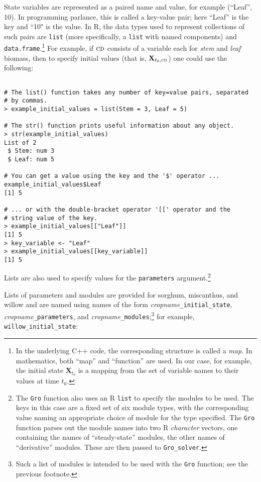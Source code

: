 \documentclass{article}
\newcommand{\code}[1]{\texttt{#1}}
\newcommand{\boldX}{\mathbf{X}}
\newcommand{\cd}{\textsc{cd}}
\begin{document}
State variables are represented as a paired name and value, for
example (``Leaf'', 10). In programming parlance, this is called a
key-value pair; here ``Leaf'' is the key and ``10" is the value.  In
R, the data types used to represent collections of such pairs are
\code{list} (more specifically, a \code{list} with named components)
and \code{data.frame}.\footnote{In the underlying C++ code, the
  corresponding structure is called a \emph{map}.  In mathematics,
  both ``map'' and ``function'' are used.  In our case, for example,
  the initial state $\boldX_{t_0}$ is a mapping from the set of
  variable names to their values at time $t_0$.} For example, if $\cd$
consists of a variable each for \emph{stem} and \emph{leaf} biomass,
then to specify initial values (that is, $\boldX_{t_0,\cd}$) one could
use the following:

\lstset{
  xleftmargin=0.05\textwidth, xrightmargin=0.2\textwidth
}

\begin{center}
  \begin{lstlisting}
    
# The list() function takes any number of key=value pairs, separated
# by commas.
> example_initial_values = list(Stem = 3, Leaf = 5)

# The str() function prints useful information about any object.
> str(example_initial_values)
List of 2
 $ Stem: num 3
 $ Leaf: num 5
 
# You can get a value using the key and the '$' operator ...
example_initial_values$Leaf
[1] 5

# ... or with the double-bracket operator '[[' operator and the
# string value of the key.
> example_initial_values[["Leaf"]]
[1] 5
> key_variable <- "Leaf"
> example_initial_values[[key_variable]]
[1] 5
\end{lstlisting}
\end{center}


Lists are also used to specify values for the \code{parameters}
argument.\footnote{The \code{Gro} function also uses an R \code{list}
  to specify the modules to be used.  The keys in this case are a
  fixed set of six module types, with the corresponding value naming
  an appropriate choice of module for the type specified.  The
  \code{Gro} function parses out the module names into two R
  \emph{character} vectors, one containing the names of
  ``steady-state'' modules, the other names of ``derivative'' modules.
  These are then passed to \code{Gro\_solver}.}

Lists of parameters and modules are provided for sorghum, miscanthus,
and willow and are named using names of the form
\emph{cropname}\code{\_initial\_state},
\emph{cropname}\code{\_parameters}, and
\emph{cropname}\code{\_modules};\footnote{Such a list of modules is
  intended to be used with the \code{Gro} function; see the previous
  footnote.} for example, \code{willow\_initial\_state}:
\end{document}
